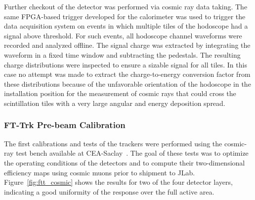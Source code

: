 Further checkout of the detector was performed via cosmic ray data taking. The same FPGA-based trigger developed
for the calorimeter was used to trigger the data acquisition system on events in which multiple tiles of the hodoscope
had a signal above threshold. For such events, all hodoscope channel waveforms were recorded and analyzed offline.
The signal charge was extracted by integrating the waveform in a fixed time window and subtracting the pedestals.
The resulting charge distributions were inspected to ensure a sizable signal for all tiles. In this case no attempt was
made to extract the charge-to-energy conversion factor from these distributions because of the unfavorable
orientation of the hodoscope in the installation position for the measurement of cosmic rays that could cross the
scintillation tiles with a very large angular and energy deposition spread.

\subsubsection{FT-Trk Pre-beam Calibration}

The first calibrations and tests of the trackers were performed using the cosmic-ray test bench available at
CEA-Saclay~\cite{mm}. The goal of these tests was to optimize the operating conditions of the detectors and to
compute their two-dimensional efficiency maps using cosmic muons prior to shipment to JLab.
Figure~\ref{fig:ftt_cosmic} shows the results for two of the four detector layers, indicating a good uniformity of
the response over the full active area. 

